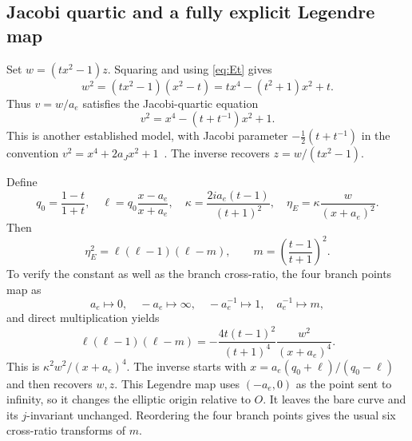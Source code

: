 \subsection{Jacobi quartic and a fully explicit Legendre map}
Set \(w=(tx^2-1)z\). Squaring and using \eqref{eq:Et} gives
\begin{equation}\label{eq:quartic}
w^2=(tx^2-1)(x^2-t)=tx^4-(t^2+1)x^2+t.
\end{equation}
Thus \(v=w/a_e\) satisfies the Jacobi-quartic equation
\[
v^2=x^4-(t+t^{-1})x^2+1.
\]
This is another established model, with Jacobi parameter \(-\tfrac12(t+t^{-1})\) in the convention \(v^2=x^4+2a_Jx^2+1\)~\cite{EFD}. The inverse recovers \(z=w/(tx^2-1)\).

Define
\begin{equation}\label{eq:Legendrechange}
q_0=\frac{1-t}{1+t},\quad
\ell=q_0\frac{x-a_e}{x+a_e},\quad
\kappa=\frac{2ia_e(t-1)}{(t+1)^2},\quad
\eta_E=\kappa\frac{w}{(x+a_e)^2}.
\end{equation}
Then
\begin{equation}\label{eq:Legendre}
\eta_E^2=\ell(\ell-1)(\ell-m),\qquad
m=\left(\frac{t-1}{t+1}\right)^2.
\end{equation}
To verify the constant as well as the branch cross-ratio, the four branch points map as
\[
a_e\mapsto0,\quad -a_e\mapsto\infty,\quad
-a_e^{-1}\mapsto1,\quad a_e^{-1}\mapsto m,
\]
and direct multiplication yields
\[
\ell(\ell-1)(\ell-m)
=-\frac{4t(t-1)^2}{(t+1)^4}\frac{w^2}{(x+a_e)^4}.
\]
This is \(\kappa^2w^2/(x+a_e)^4\). The inverse starts with
\(x=a_e(q_0+\ell)/(q_0-\ell)\) and then recovers \(w,z\). This Legendre map uses \((-a_e,0)\) as the point sent to infinity, so it changes the elliptic origin relative to \(O\). It leaves the bare curve and its \(j\)-invariant unchanged. Reordering the four branch points gives the usual six cross-ratio transforms of \(m\).


